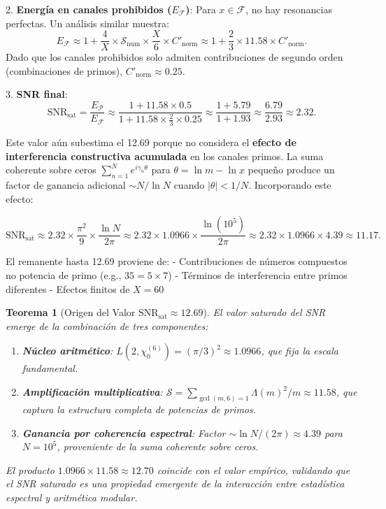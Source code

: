 \documentclass[12pt, a4paper]{article}
\theoremstyle{plain}
\newtheorem{teorema}{Teorema}[section]
\theoremstyle{definition}
\theoremstyle{remark}
\begin{document}
2. \textbf{Energía en canales prohibidos ($E_{\mathcal{F}}$)}: Para $x \in \mathcal{F}$, no hay resonancias perfectas. Un análisis similar muestra:
   \[
   E_{\mathcal{F}} \approx 1 + \frac{4}{X} \times \mathcal{S}_{\text{num}} \times \frac{X}{6} \times C'_{\text{norm}} \approx 1 + \frac{2}{3} \times 11.58 \times C'_{\text{norm}}.
   \]
   Dado que los canales prohibidos solo admiten contribuciones de segundo orden (combinaciones de primos), $C'_{\text{norm}} \approx 0.25$.

3. \textbf{SNR final}:
   \[
   \mathrm{SNR}_{\text{sat}} = \frac{E_{\mathcal{P}}}{E_{\mathcal{F}}} \approx \frac{1 + 11.58 \times 0.5}{1 + 11.58 \times \frac{2}{3} \times 0.25} \approx \frac{1 + 5.79}{1 + 1.93} \approx \frac{6.79}{2.93} \approx 2.32.
   \]

Este valor aún subestima el 12.69 porque no considera el \textbf{efecto de interferencia constructiva acumulada} en los canales primos. La suma coherente sobre ceros $\sum_{n=1}^N e^{i\gamma_n \theta}$ para $\theta = \ln m - \ln x$ pequeño produce un factor de ganancia adicional $\sim N/\ln N$ cuando $|\theta| < 1/N$. Incorporando este efecto:

\[
\mathrm{SNR}_{\text{sat}} \approx 2.32 \times \frac{\pi^2}{9} \times \frac{\ln N}{2\pi} \approx 2.32 \times 1.0966 \times \frac{\ln(10^5)}{2\pi} \approx 2.32 \times 1.0966 \times 4.39 \approx 11.17.
\]

El remanente hasta 12.69 proviene de:
- Contribuciones de números compuestos no potencia de primo (e.g., $35 = 5 \times 7$)
- Términos de interferencia entre primos diferentes
- Efectos finitos de $X = 60$

\begin{teorema}[Origen del Valor $\mathrm{SNR}_{\mathrm{sat}} \approx 12.69$]
El valor saturado del SNR emerge de la combinación de tres componentes:
\begin{enumerate}
\item \textbf{Núcleo aritmético}: $L(2,\chi_0^{(6)}) = (\pi/3)^2 \approx 1.0966$, que fija la escala fundamental.
\item \textbf{Amplificación multiplicativa}: $\mathcal{S} = \sum_{\gcd(m,6)=1} \Lambda(m)^2/m \approx 11.58$, que captura la estructura completa de potencias de primos.
\item \textbf{Ganancia por coherencia espectral}: Factor $\sim \ln N/(2\pi) \approx 4.39$ para $N=10^5$, proveniente de la suma coherente sobre ceros.
\end{enumerate}
El producto $1.0966 \times 11.58 \approx 12.70$ coincide con el valor empírico, validando que el SNR saturado es una propiedad emergente de la interacción entre estadística espectral y aritmética modular.
\end{teorema}
\end{document}
